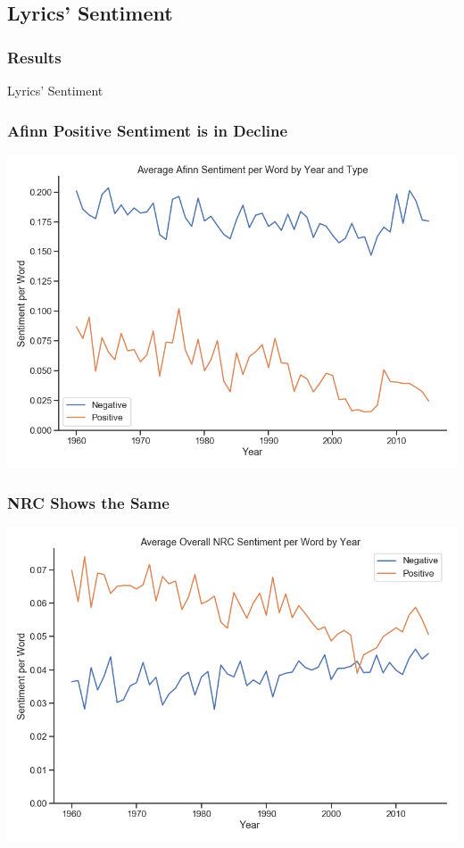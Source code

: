\documentclass[10pt]{beamer}
\begin{document}
\subsection{Lyrics' Sentiment}

\begin{frame}
\frametitle{Results}

\LARGE{\centerline{Lyrics' Sentiment}}

\end{frame}

\begin{frame}
\frametitle{Afinn Positive Sentiment is in Decline}

{
    \centering
    \includegraphics[width=\textwidth, height=\textheight,keepaspectratio]{average_afinn_sentiment_by_year.png}
    \par
}

\end{frame}

\begin{frame}
\frametitle{NRC Shows the Same}

{
    \centering
    \includegraphics[width=\textwidth, height=\textheight,keepaspectratio]{average_nrc_emotions_overall_by_year.png}
    \par
}

\end{frame}
\end{document}

